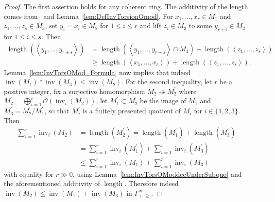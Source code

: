 \documentclass[11pt]{article}
\theoremstyle{definition}
\numberwithin{equation}{section}
\numberwithin{figure}{section}
\numberwithin{table}{section}
\DeclareMathOperator{\inv}{inv}
\DeclareMathOperator{\length}{length}
\begin{document}
\begin{proof}
The first assertion holds for any coherent ring. The additivity of the length comes from~\cite[6.3.1]{GaRa03} and Lemma~\ref{lem:DefInvTorsionOmod}. For $x_{1},\dots,x_{r}\in M_{1}$ and $z_{1},\dots,z_{s}\in M_{3}$, set $y_{i}=x_{i}\in M_{2}$ for $1\leq i\leq r$ and lift $z_{i}\in M_{3}$ to some $y_{r+i}\in M_{2}$ for $1\leq i\leq s$. Then
\begin{align*}
\length\left(\left\langle y_{1},\dots,y_{r+s}\right\rangle \right) & = \length\left(\left\langle y_{1},\dots,y_{r+s}\right\rangle \cap M_{1}\right)+\length\left(\left\langle z_{1},\dots,z_{s}\right\rangle \right)\\
& \geq \length\left(\left\langle x_{1},\dots,x_{r}\right\rangle \right)+\length\left(\left\langle z_{1},\dots,z_{s}\right\rangle \right).
\end{align*}
Lemma~\ref{lem:InvTorsOMod_Formula} now implies that indeed $\inv(M_{1})\ast\inv(M_{3})\leq\inv(M_{2})$. For the second inequality, let $r$ be a positive integer, fix a surjective homomorphism $M_{2}\twoheadrightarrow M_{2}^{\prime}$ where $M_{2}^{\prime}=\bigoplus_{i=1}^{r}\mathcal{O}(\inv_{i}(M_{2}))$, let $M_{1}^{\prime}\subset M_{2}^{\prime}$ be the image of $M_{1}$ and $M_{3}^{\prime}=M_{2}^{\prime}/M_{1}^{\prime}$, so that $M_{i}^{\prime}$ is a finitely presented quotient of $M_{i}$ for $i\in\{1,2,3\}$. Then
\begin{align*}
{\sum_{i=1}^{r}}\inv_{i}(M_{2}) & =\length(M_{2}^{\prime})=\length(M_{1}^{\prime})+\length(M_{3}^{\prime})\\
& ={\sum_{i=1}^{r}}\inv_{i}(M_{1}^{\prime})+{\sum_{i=1}^{r}}\inv_{i}(M_{3}^{\prime})\\
& \leq{\sum_{i=1}^{r}}\inv_{i}(M_{1})+{\sum_{i=1}^{r}}\inv_{i}(M_{3})
\end{align*}
with equality for $r\gg0$, using Lemma~\ref{lem:InvTorsOModdecUnderSubquo} and the aforementioned additivity of $\length$. Therefore indeed $\inv(M_{2})\leq\inv(M_{1})+\inv(M_{3})$ in $\Gamma_{+,\geq}^{\infty}$.


\end{proof}
\end{document}
